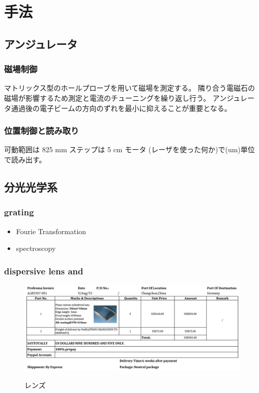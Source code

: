 \documentclass[a4paper,11pt,uplatex]{jsarticle}
\begin{document}
\section{手法}
\subsection{アンジュレータ}

\subsubsection{磁場制御}

マトリックス型のホールプローブを用いて磁場を測定する。
隣り合う電磁石の磁場が影響するため測定と電流のチューニングを繰り返し行う。
アンジュレータ通過後の電子ビームの方向のずれを最小に抑えることが重要となる。

\subsubsection{位置制御と読み取り}
可動範囲は 825 mm
ステップは 5 cm
モータ
(レーザを使った何か)で(um)単位で読み出す。

\subsection{分光光学系}

\subsubsection{grating}
\begin{itemize}
  \item Fourie Transformation
  \item spectroscopy
\end{itemize}

\subsubsection{dispersive lens and }
\begin{figure}[tb]
  \centering
  \includegraphics[width=0.8\linewidth]{image/3-lens.png}\\
  \caption{レンズ}
  \label{lens}
\end{figure}
\end{document}
